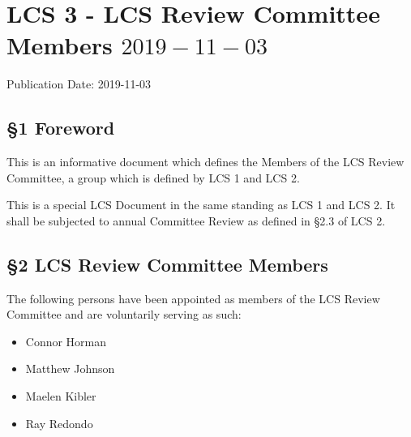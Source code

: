 \section{LCS 3 - LCS Review Committee Members \(2019-11-03\)}\label{lcs-3---lcs-review-committee-members-2019-11-03}

Publication Date: 2019-11-03

\subsection{§1 Foreword}\label{foreword}

This is an informative document which defines the Members of the LCS
Review Committee, a group which is defined by LCS 1 and LCS 2.

This is a special LCS Document in the same standing as LCS 1 and LCS 2.
It shall be subjected to annual Committee Review as defined in §2.3 of
LCS 2.

\subsection{§2 LCS Review Committee
Members}\label{lcs-review-committee-members}

The following persons have been appointed as members of the LCS Review
Committee and are voluntarily serving as such:
\begin{itemize}
 \item Connor Horman
 \item Matthew Johnson
 \item Maelen Kibler
 \item Ray Redondo
\end{itemize}
